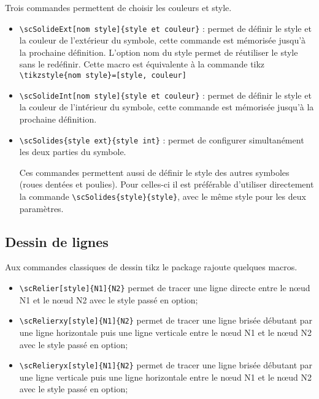 \documentclass[a4paper,11pt]{article}                      %
\begin{document}
Trois commandes permettent de choisir les couleurs et style.
\begin{itemize}
\item \verb"\scSolideExt[nom style]{style et couleur}" :  permet de définir le style et la couleur de l'extérieur du symbole, cette commande est mémorisée jusqu'à la prochaine définition. L'option nom du style permet de réutiliser le style sans le redéfinir. Cette macro est équivalente à la commande tikz \verb"\tikzstyle{nom style}=[style, couleur]"

\item \verb"\scSolideInt[nom style]{style et couleur}" : permet de définir le style et la couleur de l'intérieur du symbole, cette commande est mémorisée jusqu'à la prochaine définition.


\item \verb"\scSolides{style ext}{style int}" : permet de configurer simultanément les deux parties du symbole.

Ces commandes permettent aussi de définir le style des autres symboles (roues dentées et poulies). Pour celles-ci il est préférable d'utiliser directement la commande \verb"\scSolides{style}{style}", avec le même style pour les deux paramètres.
\end{itemize}

\begin{tkzexample}

\end{tkzexample}


\subsection{Dessin de lignes}

Aux commandes classiques de dessin tikz le package rajoute quelques macros.

\begin{itemize}
\item \verb"\scRelier[style]{N1]{N2}"  permet de tracer une ligne directe entre le n\oe ud N1  et le n\oe ud N2 avec le style passé en option;
\item \verb"\scRelierxy[style]{N1]{N2}"  permet de tracer une ligne brisée débutant par une ligne horizontale puis une ligne verticale entre le n\oe ud N1  et le n\oe ud N2 avec le style passé en option;
\item  \verb"\scRelieryx[style]{N1]{N2}"  permet de tracer une ligne brisée débutant par une ligne verticale   puis une ligne horizontale  entre le n\oe ud N1  et le n\oe ud N2 avec le style passé en option;
\end{itemize}
\end{document}
